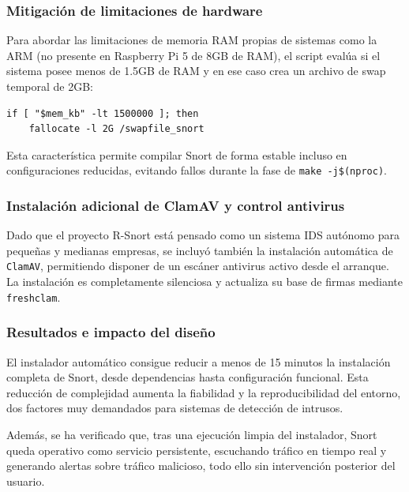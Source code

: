 \documentclass[11pt,a4paper,twoside]{report}
\begin{document}
\subsubsection{Mitigación de limitaciones de hardware}

Para abordar las limitaciones de memoria RAM propias de sistemas como la ARM (no presente en Raspberry Pi 5 de 8GB de RAM), el script evalúa si el sistema posee menos de 1.5GB de RAM y en ese caso crea un archivo de swap temporal de 2GB:

\begin{lstlisting}[style=commandstyle, caption={Sistema de swap}]
	if [ "$mem_kb" -lt 1500000 ]; then
	fallocate -l 2G /swapfile_snort
\end{lstlisting}

Esta característica permite compilar Snort de forma estable incluso en configuraciones reducidas, evitando fallos durante la fase de \texttt{make -j\$(nproc)}.

\subsubsection{Instalación adicional de ClamAV y control antivirus}

Dado que el proyecto R-Snort está pensado como un sistema IDS autónomo para pequeñas y medianas empresas, se incluyó también la instalación automática de \texttt{ClamAV}, permitiendo disponer de un escáner antivirus activo desde el arranque. La instalación es completamente silenciosa y actualiza su base de firmas mediante \texttt{freshclam}.

\subsubsection{Resultados e impacto del diseño}

El instalador automático consigue reducir a menos de 15 minutos la instalación completa de Snort, desde dependencias hasta configuración funcional. Esta reducción de complejidad aumenta la fiabilidad y la reproducibilidad del entorno, dos factores muy demandados para sistemas de detección de intrusos.\newline

Además, se ha verificado que, tras una ejecución limpia del instalador, Snort queda operativo como servicio persistente, escuchando tráfico en tiempo real y generando alertas sobre tráfico malicioso, todo ello sin intervención posterior del usuario.

\pagebreak
\end{document}
